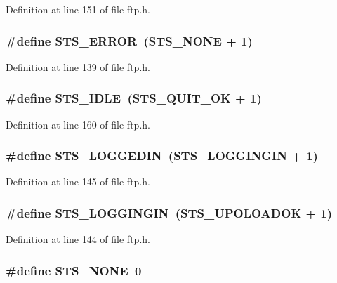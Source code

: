 Definition at line 151 of file ftp.h.

\hypertarget{group__ftp_gadf48c1088e7b27fa287d1d2e6c941bc3}{
\subsubsection[{STS\_\-ERROR}]{\setlength{\rightskip}{0pt plus 5cm}\#define STS\_\-ERROR~(STS\_\-NONE + 1)}}
\label{group__ftp_gadf48c1088e7b27fa287d1d2e6c941bc3}


Definition at line 139 of file ftp.h.

\hypertarget{group__ftp_ga6be5ad15a4a71e84d34d984b75f9904a}{
\subsubsection[{STS\_\-IDLE}]{\setlength{\rightskip}{0pt plus 5cm}\#define STS\_\-IDLE~(STS\_\-QUIT\_\-OK + 1)}}
\label{group__ftp_ga6be5ad15a4a71e84d34d984b75f9904a}


Definition at line 160 of file ftp.h.

\hypertarget{group__ftp_gaf68741feccc4b63d819090a11c1d6786}{
\subsubsection[{STS\_\-LOGGEDIN}]{\setlength{\rightskip}{0pt plus 5cm}\#define STS\_\-LOGGEDIN~(STS\_\-LOGGINGIN + 1)}}
\label{group__ftp_gaf68741feccc4b63d819090a11c1d6786}


Definition at line 145 of file ftp.h.

\hypertarget{group__ftp_ga4ffd18340d269b7f62cdf58d0de8eda8}{
\subsubsection[{STS\_\-LOGGINGIN}]{\setlength{\rightskip}{0pt plus 5cm}\#define STS\_\-LOGGINGIN~(STS\_\-UPOLOADOK + 1)}}
\label{group__ftp_ga4ffd18340d269b7f62cdf58d0de8eda8}


Definition at line 144 of file ftp.h.

\hypertarget{group__ftp_ga30b7e26a0e7ce7ac0d823c31b22de694}{
\subsubsection[{STS\_\-NONE}]{\setlength{\rightskip}{0pt plus 5cm}\#define STS\_\-NONE~0}}
\label{group__ftp_ga30b7e26a0e7ce7ac0d823c31b22de694}



